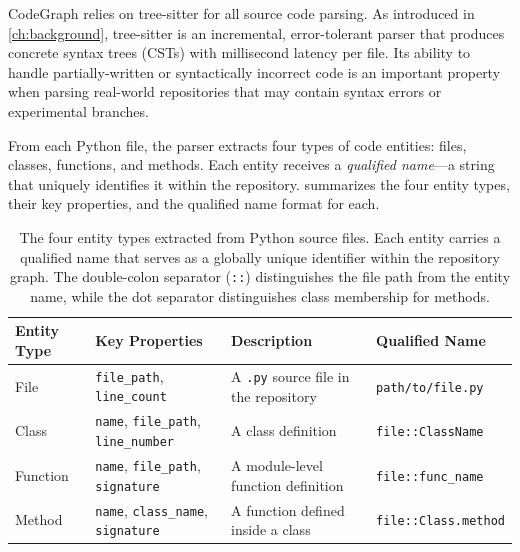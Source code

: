 CodeGraph relies on tree-sitter for all source code parsing. As introduced in \cref{ch:background}, tree-sitter is an incremental, error-tolerant parser that produces concrete syntax trees (CSTs) with millisecond latency per file. Its ability to handle partially-written or syntactically incorrect code is an important property when parsing real-world repositories that may contain syntax errors or experimental branches.

From each Python file, the parser extracts four types of code entities: files, classes, functions, and methods. Each entity receives a \emph{qualified name}---a string that uniquely identifies it within the repository.  summarizes the four entity types, their key properties, and the qualified name format for each.

\begin{table}[H]
    \centering
    \caption[Entity types extracted by the parser]{The four entity types extracted from Python source files. Each entity carries a qualified name that serves as a globally unique identifier within the repository graph. The double-colon separator (\texttt{::}) distinguishes the file path from the entity name, while the dot separator distinguishes class membership for methods.}
    \label{tab:entity-types}
    \begin{tabularx}{\textwidth}{l l X l}
        \toprule
        \textbf{Entity Type} & \textbf{Key Properties}                                   & \textbf{Description}                         & \textbf{Qualified Name}     \\
        \midrule
        File                 & \texttt{file\_path}, \texttt{line\_count}                 & A \texttt{.py} source file in the repository & \texttt{path/to/file.py}    \\
        \addlinespace[3pt]
        Class                & \texttt{name}, \texttt{file\_path}, \texttt{line\_number} & A class definition                           & \texttt{file::ClassName}    \\
        \addlinespace[3pt]
        Function             & \texttt{name}, \texttt{file\_path}, \texttt{signature}    & A module-level function definition           & \texttt{file::func\_name}   \\
        \addlinespace[3pt]
        Method               & \texttt{name}, \texttt{class\_name}, \texttt{signature}   & A function defined inside a class            & \texttt{file::Class.method} \\
        \bottomrule
    \end{tabularx}
\end{table}

